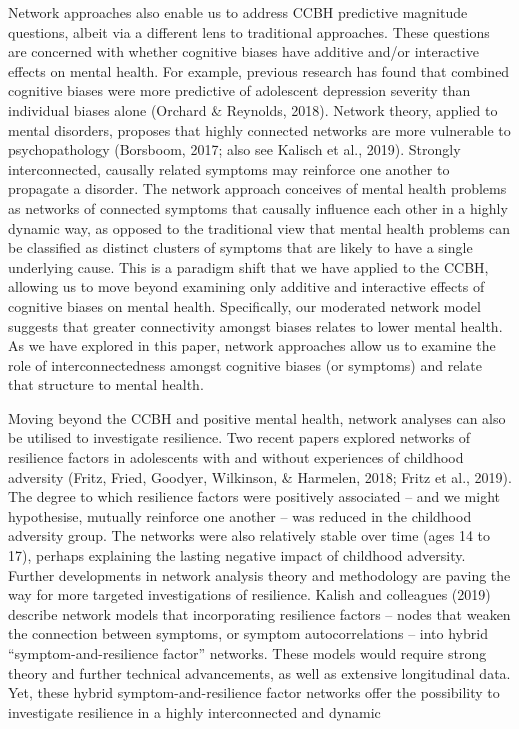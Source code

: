 \documentclass[man,floatsintext]{apa6}
\begin{document}
Network approaches also enable us to address CCBH predictive magnitude questions, albeit via a different lens to traditional approaches. These questions are concerned with whether cognitive biases have additive and/or interactive effects on mental health. For example, previous research has found that combined cognitive biases were more predictive of adolescent depression severity than individual biases alone (Orchard \& Reynolds, 2018). Network theory, applied to mental disorders, proposes that highly connected networks are more vulnerable to psychopathology (Borsboom, 2017; also see Kalisch et al., 2019). Strongly interconnected, causally related symptoms may reinforce one another to propagate a disorder. The network approach conceives of mental health problems as networks of connected symptoms that causally influence each other in a highly dynamic way, as opposed to the traditional view that mental health problems can be classified as distinct clusters of symptoms that are likely to have a single underlying cause. This is a paradigm shift that we have applied to the CCBH, allowing us to move beyond examining only additive and interactive effects of cognitive biases on mental health. Specifically, our moderated network model suggests that greater connectivity amongst biases relates to lower mental health. As we have explored in this paper, network approaches allow us to examine the role of interconnectedness amongst cognitive biases (or symptoms) and relate that structure to mental health.

Moving beyond the CCBH and positive mental health, network analyses can also be utilised to investigate resilience. Two recent papers explored networks of resilience factors in adolescents with and without experiences of childhood adversity (Fritz, Fried, Goodyer, Wilkinson, \& Harmelen, 2018; Fritz et al., 2019). The degree to which resilience factors were positively associated -- and we might hypothesise, mutually reinforce one another -- was reduced in the childhood adversity group. The networks were also relatively stable over time (ages 14 to 17), perhaps explaining the lasting negative impact of childhood adversity. Further developments in network analysis theory and methodology are paving the way for more targeted investigations of resilience. Kalish and colleagues (2019) describe network models that incorporating resilience factors -- nodes that weaken the connection between symptoms, or symptom autocorrelations -- into hybrid \enquote{symptom-and-resilience factor} networks. These models would require strong theory and further technical advancements, as well as extensive longitudinal data. Yet, these hybrid symptom-and-resilience factor networks offer the possibility to investigate resilience in a highly interconnected and dynamic
\end{document}
